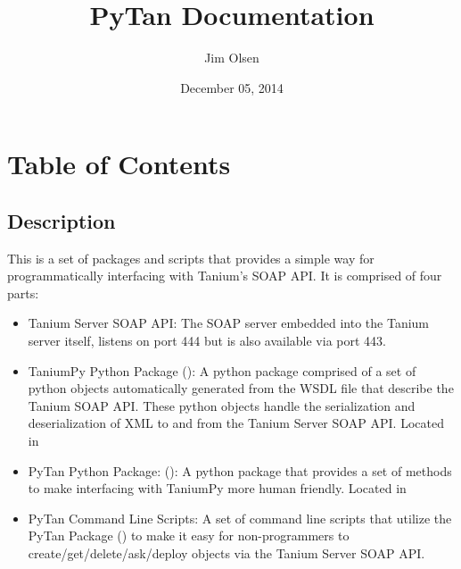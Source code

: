 \documentclass[letterpaper,10pt,english]{sphinxmanual}
\title{PyTan Documentation}
\date{December 05, 2014}
\author{Jim Olsen}
\begin{document}
\maketitle
\tableofcontents
{}\label{index::doc}



\chapter{Table of Contents}
\label{index:table-of-contents}\label{index:welcome-to-pytan-s-documentation}

\section{Description}
\label{description::doc}\label{description:description}
This is a set of packages and scripts that provides a simple way for programmatically interfacing with Tanium's SOAP API. It is comprised of four parts:
\begin{itemize}
\item {} 
Tanium Server SOAP API: The SOAP server embedded into the Tanium server itself, listens on port 444 but is also available via port 443.

\item {} 
TaniumPy Python Package ({\hyperref[taniumpy:module-taniumpy]{}}): A python package comprised of a set of python objects automatically generated from the WSDL file that describe the Tanium SOAP API. These python objects handle the serialization and deserialization of XML to and from the Tanium Server SOAP API. Located in 

\item {} 
PyTan Python Package: ({\hyperref[pytan:module-pytan]{}}): A python package that provides a set of methods to make interfacing with TaniumPy more human friendly. Located in 

\item {} 
PyTan Command Line Scripts: A set of command line scripts that utilize the PyTan Package ({\hyperref[pytan:module-pytan]{}}) to make it easy for non-programmers to create/get/delete/ask/deploy objects via the Tanium Server SOAP API.

\end{itemize}
\end{document}
